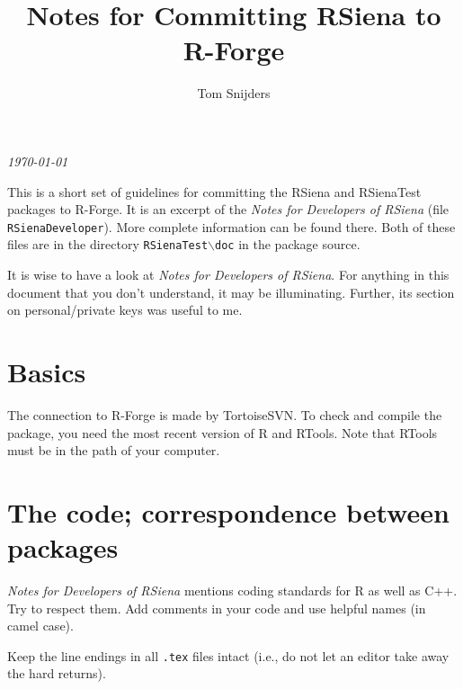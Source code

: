 \documentclass[12pt, a4paper]{article}
\renewcommand{\=}{\,=\,}
\newcommand{\+}{\,+\,}
\newcommand{\bs}{\backslash}
\begin{document}
\title{\vspace*{-0.5cm} Notes for Committing RSiena to R-Forge}
\author{Tom Snijders}
\date{}
\maketitle

\centerline{\emph{\today}}
\bigskip

This is a short set of guidelines for committing the RSiena and RSienaTest packages
to R-Forge. It is an excerpt of the \emph{Notes for Developers of RSiena}
(file \texttt{RSienaDeveloper}). More complete information can be found there.
Both of these files are in the directory \texttt{RSienaTest{$\bs$}doc}
in the package source.

It is wise to have a look at \emph{Notes for Developers of RSiena}.
For anything in this document that you don't understand, it may be illuminating.
Further, its section on personal/private keys was useful to me.


\section{Basics}

The connection to R-Forge is made by TortoiseSVN.
To check and compile the package, you need the most recent version of R
and RTools. Note that RTools must be in the path of your computer.

\section{The code; correspondence between packages}

\emph{Notes for Developers of RSiena} mentions coding standards for R as well as C++.
Try to respect them.
Add comments in your code and use helpful names (in camel case).

Keep the line endings in all \texttt{.tex} files intact (i.e., do not let
an editor take away the hard returns).
\end{document}
